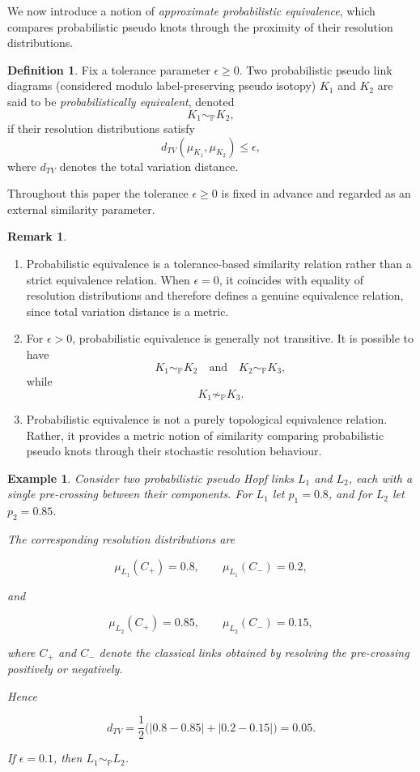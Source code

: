 \documentclass[a4paper, reqno, 12pt]{amsart}
\theoremstyle{plain}
\newtheorem{ex}[theorem]{Example}
\theoremstyle{definition}
\newtheorem{definition}[theorem]{Definition}
\newtheorem{remark}[theorem]{Remark}
\begin{document}
We now introduce a notion of \emph{approximate probabilistic equivalence}, which compares probabilistic pseudo knots through the proximity of their resolution distributions.

\begin{definition}\rm
Fix a tolerance parameter $\epsilon\geq 0$. Two probabilistic pseudo link diagrams (considered modulo label-preserving pseudo isotopy) $K_1$ and $K_2$ are said to be {\it probabilistically equivalent}, denoted
\[
K_1 \sim_{\mathbb P} K_2,
\]
if their resolution distributions satisfy
\[
d_{TV}(\mu_{K_1},\mu_{K_2}) \le \epsilon,
\]
where $d_{TV}$ denotes the total variation distance.
\end{definition}

\noindent Throughout this paper the tolerance $\epsilon\geq 0$ is fixed in advance and regarded as an external similarity parameter.




\begin{remark}\rm
\begin{enumerate}

\item Probabilistic equivalence is a tolerance-based similarity relation rather than a strict equivalence relation. When $\epsilon=0$, it coincides with equality of resolution distributions and therefore defines a genuine equivalence relation, since total variation distance is a metric.

\item For $\epsilon>0$, probabilistic equivalence is generally not transitive. It is possible to have
\[
K_1 \sim_{\mathbb P} K_2
\quad \text{and} \quad
K_2 \sim_{\mathbb P} K_3,
\]
while
\[
K_1 \not\sim_{\mathbb P} K_3.
\]

\item Probabilistic equivalence is not a purely topological equivalence relation. Rather, it provides a metric notion of similarity comparing probabilistic pseudo knots through their stochastic resolution behaviour.

\end{enumerate}
\end{remark}


\begin{ex}\rm
Consider two probabilistic pseudo Hopf links $L_1$ and $L_2$, each with a single pre-crossing between their components. For $L_1$ let $p_1=0.8$, and for $L_2$ let $p_2=0.85$.

The corresponding resolution distributions are

\[
\mu_{L_1}(C_+)=0.8,
\qquad
\mu_{L_1}(C_-)=0.2,
\]

and

\[
\mu_{L_2}(C_+)=0.85,
\qquad
\mu_{L_2}(C_-)=0.15,
\]

where $C_+$ and $C_-$ denote the classical links obtained by resolving the pre-crossing positively or negatively.

Hence

\[
d_{TV}
=
\frac12
\Big(
|0.8-0.85|
+
|0.2-0.15|
\Big)
=
0.05 .
\]

If $\epsilon=0.1$, then $L_1 \sim_{\mathbb P} L_2$.
\end{ex}
\end{document}
